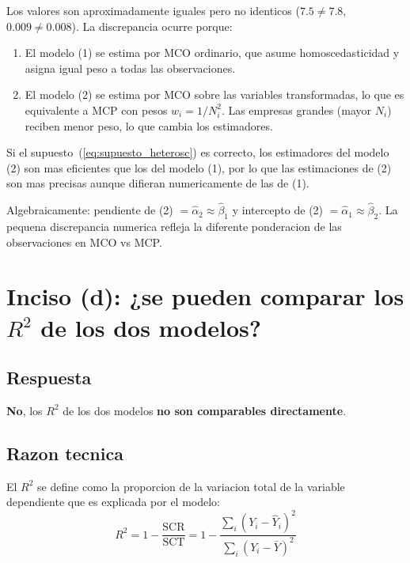 \documentclass[12pt, letterpaper]{article}
\theoremstyle{remark}
\begin{document}
\vspace{6pt}

Los valores son aproximadamente iguales pero no identicos ($7.5 \neq 7.8$,
$0.009 \neq 0.008$). La discrepancia ocurre porque:

\begin{enumerate}[leftmargin=1.8em, itemsep=4pt]
  \item El modelo (1) se estima por MCO ordinario, que asume homoscedasticidad
    y asigna igual peso a todas las observaciones.
  \item El modelo (2) se estima por MCO sobre las variables transformadas, lo
    que es equivalente a MCP con pesos $w_i = 1/N_i^2$. Las empresas grandes
    (mayor $N_i$) reciben menor peso, lo que cambia los estimadores.
\end{enumerate}

Si el supuesto~(\ref{eq:supuesto_heterosc}) es correcto, los estimadores del
modelo (2) son mas eficientes que los del modelo (1), por lo que las estimaciones
de (2) son mas precisas aunque difieran numericamente de las de (1).

\begin{clave}
  Algebraicamente: pendiente de (2) $= \hat\alpha_2 \approx \hat\beta_1$ y
  intercepto de (2) $= \hat\alpha_1 \approx \hat\beta_2$. La pequena discrepancia
  numerica refleja la diferente ponderacion de las observaciones en MCO vs MCP.
\end{clave}

\section{Inciso (d): ¿se pueden comparar los $R^2$ de los dos modelos?}

\subsection{Respuesta}

\textbf{No}, los $R^2$ de los dos modelos \textbf{no son comparables directamente}.

\subsection{Razon tecnica}

El $R^2$ se define como la proporcion de la variacion total de la variable
dependiente que es explicada por el modelo:
\begin{equation}
  R^2 = 1 - \frac{\text{SCR}}{\text{SCT}}
      = 1 - \frac{\sum_i (Y_i - \hat Y_i)^2}{\sum_i (Y_i - \bar Y)^2}
  \label{eq:R2_def}
\end{equation}
\end{document}
